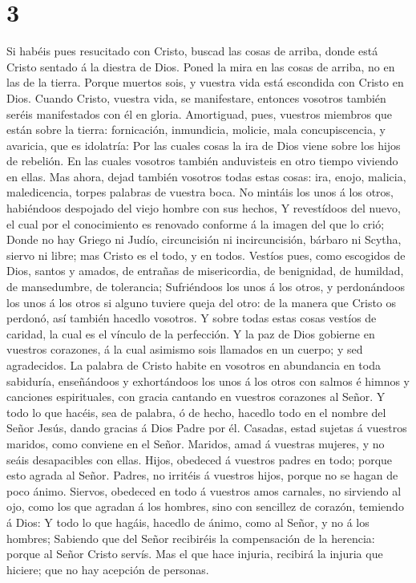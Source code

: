 \hypertarget{section-2}{%
\section{3}\label{section-2}}

 Si habéis pues resucitado con Cristo, buscad las cosas de
arriba, donde está Cristo sentado á la diestra de Dios. 
Poned la mira en las cosas de arriba, no en las de la tierra.
 Porque muertos sois, y vuestra vida está escondida con
Cristo en Dios.  Cuando Cristo, vuestra vida, se
manifestare, entonces vosotros también seréis manifestados con él en
gloria.  Amortiguad, pues, vuestros miembros que están
sobre la tierra: fornicación, inmundicia, molicie, mala concupiscencia,
y avaricia, que es idolatría:  Por las cuales cosas la ira
de Dios viene sobre los hijos de rebelión.  En las cuales
vosotros también anduvisteis en otro tiempo viviendo en ellas.
 Mas ahora, dejad también vosotros todas estas cosas: ira,
enojo, malicia, maledicencia, torpes palabras de vuestra boca.
 No mintáis los unos á los otros, habiéndoos despojado del
viejo hombre con sus hechos,  Y revestídoos del nuevo, el
cual por el conocimiento es renovado conforme á la imagen del que lo
crió;  Donde no hay Griego ni Judío, circuncisión ni
incircuncisión, bárbaro ni Scytha, siervo ni libre; mas Cristo es el
todo, y en todos.  Vestíos pues, como escogidos de Dios,
santos y amados, de entrañas de misericordia, de benignidad, de
humildad, de mansedumbre, de tolerancia;  Sufriéndoos los
unos á los otros, y perdonándoos los unos á los otros si alguno tuviere
queja del otro: de la manera que Cristo os perdonó, así también hacedlo
vosotros.  Y sobre todas estas cosas vestíos de caridad,
la cual es el vínculo de la perfección.  Y la paz de Dios
gobierne en vuestros corazones, á la cual asimismo sois llamados en un
cuerpo; y sed agradecidos.  La palabra de Cristo habite
en vosotros en abundancia en toda sabiduría, enseñándoos y exhortándoos
los unos á los otros con salmos é himnos y canciones espirituales, con
gracia cantando en vuestros corazones al Señor.  Y todo
lo que hacéis, sea de palabra, ó de hecho, hacedlo todo en el nombre del
Señor Jesús, dando gracias á Dios Padre por él.  Casadas,
estad sujetas á vuestros maridos, como conviene en el Señor.
 Maridos, amad á vuestras mujeres, y no seáis
desapacibles con ellas.  Hijos, obedeced á vuestros
padres en todo; porque esto agrada al Señor.  Padres, no
irritéis á vuestros hijos, porque no se hagan de poco ánimo.
 Siervos, obedeced en todo á vuestros amos carnales, no
sirviendo al ojo, como los que agradan á los hombres, sino con sencillez
de corazón, temiendo á Dios:  Y todo lo que hagáis,
hacedlo de ánimo, como al Señor, y no á los hombres; 
Sabiendo que del Señor recibiréis la compensación de la herencia: porque
al Señor Cristo servís.  Mas el que hace injuria,
recibirá la injuria que hiciere; que no hay acepción de personas.

